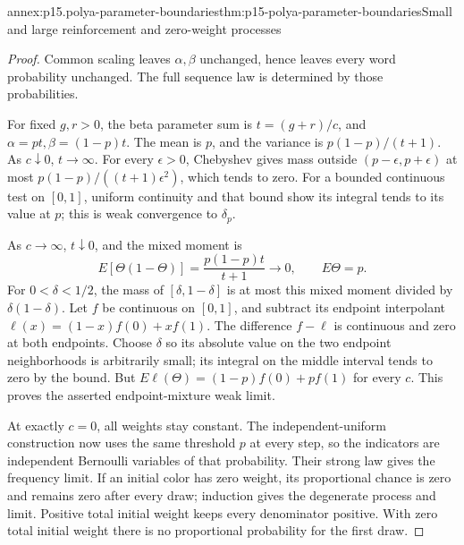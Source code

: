 \begin{annexitem}{annex:p15.polya-parameter-boundaries}{thm:p15-polya-parameter-boundaries}{Small and large reinforcement and zero-weight processes}
\begin{proof}
Common scaling leaves \(\alpha,\beta\) unchanged, hence leaves every
word probability unchanged. The full sequence law is determined by
those probabilities.

For fixed \(g,r>0\), the beta parameter sum is \(t=(g+r)/c\),
and \(\alpha=pt,\beta=(1-p)t\).
The mean is \(p\), and the variance is \(p(1-p)/(t+1)\).
As \(c\downarrow0\), \(t\to\infty\). For every \(\epsilon>0\),
Chebyshev gives mass outside \((p-\epsilon,p+\epsilon)\) at most
\(p(1-p)/((t+1)\epsilon^2)\), which tends to zero.
For a bounded continuous test on \([0,1]\), uniform continuity
and that bound show its integral tends to its value at \(p\);
this is weak convergence to \(\delta_p\).

As \(c\to\infty\), \(t\downarrow0\), and the mixed moment is
\[
          E[\Theta(1-\Theta)]=\frac{p(1-p)t}{t+1}\longrightarrow0,
          \qquad E\Theta=p.
\]
For \(0<\delta<1/2\), the mass of \([\delta,1-\delta]\) is at most
this mixed moment divided by \(\delta(1-\delta)\).
Let \(f\) be continuous on \([0,1]\), and subtract its endpoint
interpolant \(\ell(x)=(1-x)f(0)+xf(1)\).
The difference \(f-\ell\) is continuous and zero at both endpoints.
Choose \(\delta\) so its absolute value on the two endpoint
neighborhoods is arbitrarily small; its integral on the middle
interval tends to zero by the bound.
But \(E\ell(\Theta)=(1-p)f(0)+pf(1)\) for every \(c\).
This proves the asserted endpoint-mixture weak limit.

At exactly \(c=0\), all weights stay constant.
The independent-uniform construction now uses the same threshold
\(p\) at every step, so the indicators are independent Bernoulli
variables of that probability. Their strong law gives the frequency
limit. If an initial color has zero weight, its proportional chance
is zero and remains zero after every draw; induction gives the
degenerate process and limit. Positive total initial weight keeps
every denominator positive. With zero total initial weight there
is no proportional probability for the first draw.
\end{proof}
\end{annexitem}

